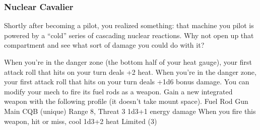 \subsubsection{Nuclear Cavalier}

\begin{talent}
{Shortly after becoming a pilot, you realized something: that machine you pilot is powered by a “cold” series of cascading nuclear reactions. Why not open up that compartment and see what sort of damage you could do with it?}

When you’re in the danger zone (the bottom half of your heat gauge), your first attack roll that hits on your turn deals +2 heat. 
When you’re in the danger zone, your first attack roll that hits on your turn deals +1d6 bonus damage. 
You can modify your mech to fire its fuel rods as a weapon. Gain a new integrated weapon with the following profile (it doesn’t take mount space). 
         Fuel Rod Gun
         Main CQB (unique)
         Range 8, Threat 3 
         1d3+1 energy damage 
         When you fire this weapon, hit or miss, cool 1d3+2 heat 
         Limited (3)
\end{talent}